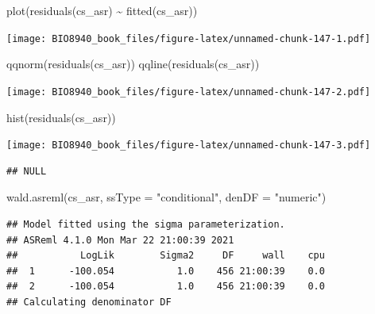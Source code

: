 \documentclass[
  12pt,
]{book}
\newenvironment{Shaded}{\begin{snugshade}}{\end{snugshade}}
\newcommand{\AttributeTok}[1]{\textcolor[rgb]{0.77,0.63,0.00}{#1}}
\newcommand{\FunctionTok}[1]{\textcolor[rgb]{0.00,0.00,0.00}{#1}}
\newcommand{\NormalTok}[1]{#1}
\newcommand{\SpecialCharTok}[1]{\textcolor[rgb]{0.00,0.00,0.00}{#1}}
\newcommand{\StringTok}[1]{\textcolor[rgb]{0.31,0.60,0.02}{#1}}
\begin{document}
\begin{Shaded}
\begin{Highlighting}[]
\FunctionTok{plot}\NormalTok{(}\FunctionTok{residuals}\NormalTok{(cs\_asr) }\SpecialCharTok{\textasciitilde{}} \FunctionTok{fitted}\NormalTok{(cs\_asr))}
\end{Highlighting}
\end{Shaded}

\texttt{[image: BIO8940\_book\_files/figure-latex/unnamed-chunk-147-1.pdf]}

\begin{Shaded}
\begin{Highlighting}[]
\FunctionTok{qqnorm}\NormalTok{(}\FunctionTok{residuals}\NormalTok{(cs\_asr))}
\FunctionTok{qqline}\NormalTok{(}\FunctionTok{residuals}\NormalTok{(cs\_asr))}
\end{Highlighting}
\end{Shaded}

\texttt{[image: BIO8940\_book\_files/figure-latex/unnamed-chunk-147-2.pdf]}

\begin{Shaded}
\begin{Highlighting}[]
\FunctionTok{hist}\NormalTok{(}\FunctionTok{residuals}\NormalTok{(cs\_asr))}
\end{Highlighting}
\end{Shaded}

\texttt{[image: BIO8940\_book\_files/figure-latex/unnamed-chunk-147-3.pdf]}

\begin{Shaded}
\end{Shaded}

\begin{verbatim}
## NULL
\end{verbatim}

\begin{Shaded}
\begin{Highlighting}[]
\FunctionTok{wald.asreml}\NormalTok{(cs\_asr, }\AttributeTok{ssType =} \StringTok{"conditional"}\NormalTok{, }\AttributeTok{denDF =} \StringTok{"numeric"}\NormalTok{)}
\end{Highlighting}
\end{Shaded}

\begin{verbatim}
## Model fitted using the sigma parameterization.
## ASReml 4.1.0 Mon Mar 22 21:00:39 2021
##           LogLik        Sigma2     DF     wall    cpu
##  1      -100.054           1.0    456 21:00:39    0.0
##  2      -100.054           1.0    456 21:00:39    0.0
## Calculating denominator DF
\end{verbatim}
\end{document}
